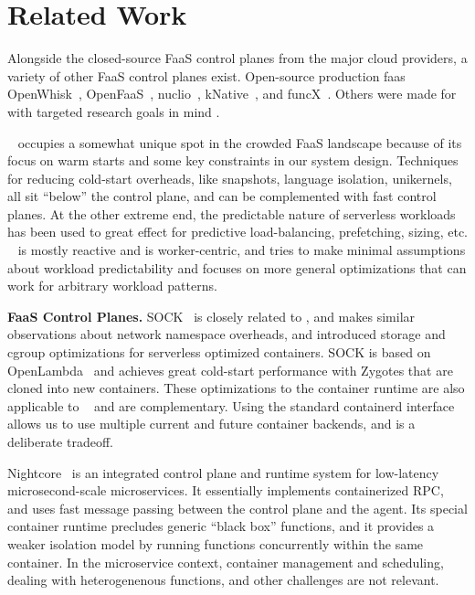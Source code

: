 \section{Related Work}
\label{sec:related}

Alongside the closed-source FaaS control planes from the major cloud providers, a variety of other FaaS control planes exist.
Open-source production faas OpenWhisk~\cite{openwhisk}, OpenFaaS~\cite{openfaas}, nuclio~\cite{nuclio}, kNative~\cite{knative}, and funcX~\cite{funcx_hpdc_20}.
Others were made for with targeted research goals in mind \cite{jia2021nightcore, hendrickson2016serverless, oakes_sock_2018, singhvi2021atoll,vhive-asplos21}.

\sysname~ occupies a somewhat unique spot in the crowded FaaS landscape because of its focus on warm starts and some key constraints in our system design.
%
Techniques for reducing cold-start overheads, like snapshots, language isolation,  unikernels, all sit ``below'' the control plane, and can be complemented with fast control planes.
At the other extreme end, the predictable nature of serverless workloads has been used to great effect for predictive load-balancing, prefetching, sizing, etc.
\sysname~ is mostly reactive and is worker-centric, and tries to make minimal assumptions about workload predictability and focuses on more general optimizations that can work for arbitrary workload patterns.
%

\noindent \textbf{FaaS Control Planes.}
%
SOCK~\cite{oakes_sock_2018} is closely related to \sysname, and makes similar observations about network namespace overheads, and introduced storage and cgroup optimizations for serverless optimized containers. 
SOCK is based on OpenLambda~\cite{hendrickson2016serverless} and achieves great cold-start performance with Zygotes that are cloned into new containers.
These optimizations to the container runtime are also applicable to \sysname~ and are complementary. 
Using the standard containerd interface allows us to use multiple current and future container backends, and is a deliberate tradeoff. 


Nightcore~\cite{jia2021nightcore} is an integrated control plane and runtime system for low-latency microsecond-scale microservices.
It essentially implements containerized RPC, and uses fast message passing between the control plane and the agent.
Its special container runtime precludes generic ``black box'' functions, and it provides a weaker isolation model by running functions concurrently within the same container.
In the microservice context, container management and scheduling, dealing with heterogenenous functions, and other challenges are not relevant.


